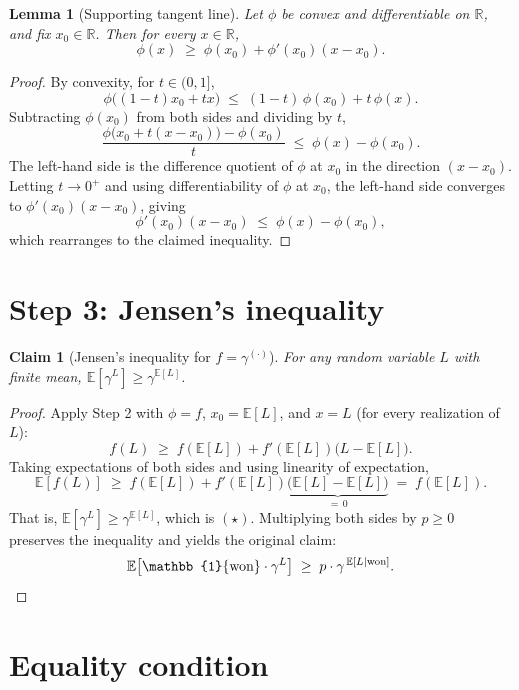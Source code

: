 \documentclass[11pt]{article}
\newtheorem{lemma}{Lemma}
\newtheorem{claim}{Claim}
\theoremstyle{remark}
\begin{document}
\begin{lemma}[Supporting tangent line]
Let $\phi$ be convex and differentiable on $\mathbb{R}$, and fix $x_0 \in \mathbb{R}$.
Then for every $x \in \mathbb{R}$,
\[
  \phi(x) \;\ge\; \phi(x_0) + \phi'(x_0)(x - x_0).
\]
\end{lemma}

\begin{proof}
By convexity, for $t \in (0,1]$,
\[
  \phi\big((1-t)x_0 + t x\big) \;\le\; (1-t)\,\phi(x_0) + t\,\phi(x).
\]
Subtracting $\phi(x_0)$ from both sides and dividing by $t$,
\[
  \frac{\phi\big(x_0 + t(x - x_0)\big) - \phi(x_0)}{t} \;\le\; \phi(x) - \phi(x_0).
\]
The left-hand side is the difference quotient of $\phi$ at $x_0$ in the direction
$(x - x_0)$. Letting $t \to 0^{+}$ and using differentiability of $\phi$ at $x_0$,
the left-hand side converges to $\phi'(x_0)(x - x_0)$, giving
\[
  \phi'(x_0)(x - x_0) \;\le\; \phi(x) - \phi(x_0),
\]
which rearranges to the claimed inequality.
\end{proof}

\section*{Step 3: Jensen's inequality}

\begin{claim}[Jensen's inequality for $f = \gamma^{(\cdot)}$]
For any random variable $L$ with finite mean, $\mathbb{E}[\gamma^{L}] \ge \gamma^{\mathbb{E}[L]}$.
\end{claim}

\begin{proof}
Apply Step 2 with $\phi = f$, $x_0 = \mathbb{E}[L]$, and $x = L$ (for every realization
of $L$):
\[
  f(L) \;\ge\; f(\mathbb{E}[L]) + f'(\mathbb{E}[L])\big(L - \mathbb{E}[L]\big).
\]
Taking expectations of both sides and using linearity of expectation,
\[
  \mathbb{E}[f(L)] \;\ge\; f(\mathbb{E}[L]) + f'(\mathbb{E}[L])\underbrace{\big(\mathbb{E}[L] - \mathbb{E}[L]\big)}_{=\,0}
  \;=\; f(\mathbb{E}[L]).
\]
That is, $\mathbb{E}[\gamma^{L}] \ge \gamma^{\mathbb{E}[L]}$, which is $(\star)$.
Multiplying both sides by $p \ge 0$ preserves the inequality and yields the original
claim:
\[
  \mathbb{E}\big[\mathbb{1}\{\text{won}\}\cdot\gamma^{L}\big] \;\ge\; p\cdot\gamma^{\,\mathbb{E}[L\mid\text{won}]}. \qedhere
\]
\end{proof}

\section*{Equality condition}
\end{document}
